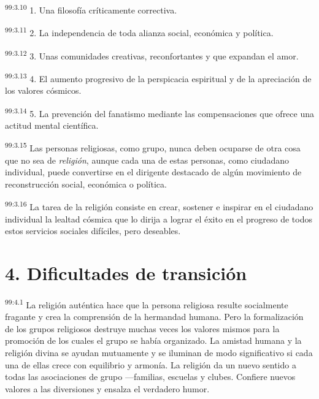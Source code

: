 \par
\textsuperscript{99:3.10} 1. Una filosofía críticamente correctiva.

\par
\textsuperscript{99:3.11} 2. La independencia de toda alianza social, económica y política.

\par
\textsuperscript{99:3.12} 3. Unas comunidades creativas, reconfortantes y que expandan el amor.

\par
\textsuperscript{99:3.13} 4. El aumento progresivo de la perspicacia espiritual y de la apreciación de los valores cósmicos.

\par
\textsuperscript{99:3.14} 5. La prevención del fanatismo mediante las compensaciones que ofrece una actitud mental científica.

\par
\textsuperscript{99:3.15} Las personas religiosas, como grupo, nunca deben ocuparse de otra cosa que no sea de \textit{religión}, aunque cada una de estas personas, como ciudadano individual, puede convertirse en el dirigente destacado de algún movimiento de reconstrucción social, económica o política.

\par
\textsuperscript{99:3.16} La tarea de la religión consiste en crear, sostener e inspirar en el ciudadano individual la lealtad cósmica que lo dirija a lograr el éxito en el progreso de todos estos servicios sociales difíciles, pero deseables.

\section*{4. Dificultades de transición}
\par
\textsuperscript{99:4.1} La religión auténtica hace que la persona religiosa resulte socialmente fragante y crea la comprensión de la hermandad humana. Pero la formalización de los grupos religiosos destruye muchas veces los valores mismos para la promoción de los cuales el grupo se había organizado. La amistad humana y la religión divina se ayudan mutuamente y se iluminan de modo significativo si cada una de ellas crece con equilibrio y armonía. La religión da un nuevo sentido a todas las asociaciones de grupo ---familias, escuelas y clubes. Confiere nuevos valores a las diversiones y ensalza el verdadero humor.

